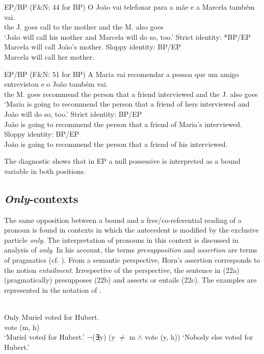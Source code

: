 \documentclass[output=paper]{langsci/langscibook}
\begin{document}
\ea%
         EP\slash BP (F\&N: 44 for BP)\label{ex:wein:20}
    \ea
    \gll O João vai telefonar para a mãe e a Marcela também vai.\\
         the J. goes call to the mother and the M. also goes  \\
    \glt ‘João will call his mother and Marcela will do so, too.’
    \ex Strict identity: *BP\slash *EP\\Marcela will call João’s mother.
    \ex Sloppy identity: BP\slash EP\\Marcela will call her mother.
    \z
\z

\ea%
         EP\slash BP (F\&N: 51 for BP)\label{ex:wein:21}
    \ea
    \gll A Maria vai recomendar a pessoa que um amigo entrevistou e o João também vai.\\
         the M. goes recommend the person that a friend interviewed and the J. also goes\\
    \glt ‘Maria is going to recommend the person that a friend of hers interviewed and João will do so, too.’
    \ex Strict identity: BP\slash *EP\\João is going to recommend the person that a friend of Maria’s interviewed.\\
    \ex Sloppy identity: BP\slash EP\\João is going to recommend the person that a friend of his interviewed. 
    \z
\z

The diagnostic shows that in EP a null possessive is interpreted as a bound variable in both positions.

\subsection{\textit{Only}-contexts}%

The same opposition between a bound and a free\slash co-referential reading of a pronoun is found in contexts in which the antecedent is modified by the exclusive particle \textit{only.} The interpretation of pronouns in this context is discussed in  analysis of \textit{only}. In his account, the terms \textit{presupposition} and \textit{assertion} are terms of pragmatics (cf. \citealt{Pagin2016}). From a semantic perspective, Horn’s assertion corresponds to the notion \textit{entailment}. Irrespective of the perspective, the sentence in (22a) (pragmatically) presupposes (22b) and asserts or entails (22c). The examples are represented in the notation of \citet{Horn1969}. 

\ea%
    \citet[98–99]{Horn1969}\label{ex:wein:22}\\
    \ea 
    Only Muriel voted for Hubert.\\
    vote (m, h)\\   
    \glt ‘Muriel voted for Hubert.’
    \ex  ¬(∃y) (y ${\neq}$ m ${\wedge}$ vote (y, h))
    \glt ‘Nobody else voted for Hubert.’
    \z
\z
\end{document}
